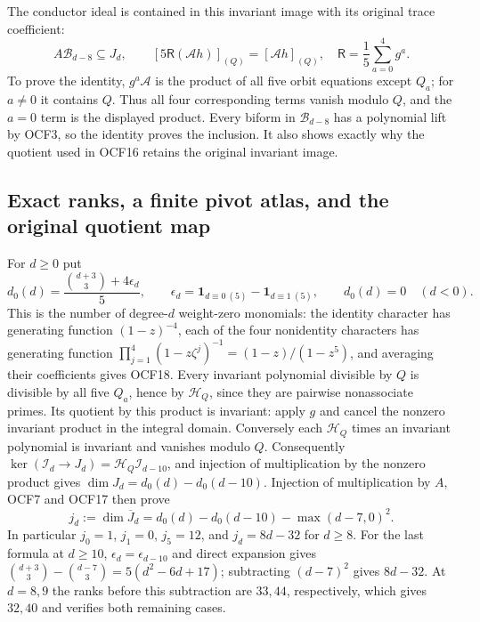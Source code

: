 \documentclass[11pt]{article}
\begin{document}
The conductor ideal is contained in this invariant image with
its original trace coefficient:
\[
 A\mathcal B_{d-8}\subseteq J_d,\qquad
 [5\mathsf R(\mathcal A h)]_{(Q)}=[\mathcal A h]_{(Q)},
 \quad\mathsf R=\frac15\sum_{a=0}^4g^a.
 \tag{OCF17}
\]
To prove the identity, $g^a\mathcal A$ is the product of all
five orbit equations except $Q_a$; for $a\ne0$ it contains $Q$.
Thus all four corresponding terms vanish modulo $Q$, and the
$a=0$ term is the displayed product. Every biform in
$\mathcal B_{d-8}$ has a polynomial lift by OCF3, so the identity
proves the inclusion. It also shows exactly why the quotient
used in OCF16 retains the original invariant image.

\subsection{Exact ranks, a finite pivot atlas, and the original quotient map}

For $d\geq0$ put
\[
 d_0(d)=\frac{\binom{d+3}{3}+4\epsilon_d}{5},\qquad
 \epsilon_d=\mathbf1_{d\equiv0\ (5)}-\mathbf1_{d\equiv1\ (5)},
 \qquad d_0(d)=0\quad(d<0).
 \tag{OCF18}
\]
This is the number of degree-$d$ weight-zero monomials: the
identity character has generating function $(1-z)^{-4}$, each
of the four nonidentity characters has generating function
$\prod_{j=1}^4(1-z\zeta^j)^{-1}=(1-z)/(1-z^5)$, and averaging
their coefficients gives OCF18.
Every invariant polynomial divisible by $Q$ is divisible by all
five $Q_a$, hence by $\mathcal H_Q$, since they are pairwise
nonassociate primes. Its quotient by this product is invariant:
apply $g$ and cancel the nonzero invariant product in the integral
domain. Conversely each $\mathcal H_Q$ times an invariant
polynomial is invariant and vanishes modulo $Q$. Consequently
$\ker(\mathscr I_d\to J_d)=\mathcal H_Q\mathscr I_{d-10}$,
and injection of multiplication by the nonzero product gives
$\dim J_d=d_0(d)-d_0(d-10)$.
Injection of multiplication by $A$, OCF7 and OCF17 then prove
\[
 j_d:=\dim\overline J_d
     =d_0(d)-d_0(d-10)-\max(d-7,0)^2.
 \tag{OCF19}
\]
In particular $j_0=1$, $j_1=0$, $j_5=12$, and
$j_d=8d-32$ for $d\geq8$. For the last formula at $d\geq10$,
$\epsilon_d=\epsilon_{d-10}$ and direct expansion gives
$\binom{d+3}{3}-\binom{d-7}{3}=5(d^2-6d+17)$;
subtracting $(d-7)^2$ gives $8d-32$. At $d=8,9$ the ranks
before this subtraction are $33,44$, respectively, which gives
$32,40$ and verifies both remaining cases.
\end{document}

